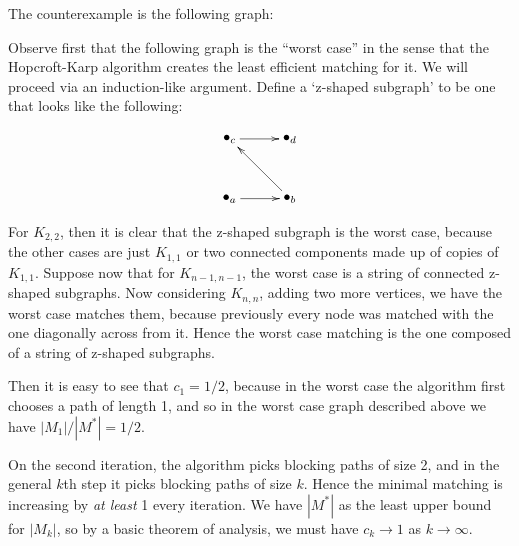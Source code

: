 \documentclass{article}
\newcommand{\problem}[1]{\noindent {\bf #1}}
\begin{document}
\problem{Problem 1.} The counterexample is the following graph:

\problem{Problem 2.} Observe first that the following graph is the ``worst case'' in the sense that the Hopcroft-Karp algorithm creates the least efficient matching for it. We will proceed via an induction-like argument. Define a `z-shaped subgraph' to be one that looks like the following:

\begin{displaymath}
\xygraph{
!{<0cm,0cm>;<1cm,0cm>:<0cm,1cm>::}
!{(0,0) }*+{\bullet_{a}}="a"
!{(1.5,0) }*+{\bullet_{b}}="b"
!{(0,1.5) }*+{\bullet_{c}}="c"
!{(1.5,1.5)}*+{\bullet_{d}}="d"
"a":"b"
"b":"c"
"c":"d"
}
\end{displaymath}

For $K_{2,2}$, then it is clear that the z-shaped subgraph is the worst case, because the other cases are just $K_{1,1}$ or two connected components made up of copies of $K_{1,1}$. Suppose now that for $K_{n-1,n-1}$, the worst case is a string of connected z-shaped subgraphs. Now considering $K_{n,n}$, adding two more vertices, we have the worst case matches them, because previously every node was matched with the one diagonally across from it. Hence the worst case matching is the one composed of a string of z-shaped subgraphs.

Then it is easy to see that $c_1=1/2$, because in the worst case the algorithm first chooses a path of length 1, and so in the worst case graph described above we have $|M_1|/|M^{\ast}|=1/2$.



On the second iteration, the algorithm picks blocking paths of size 2, and in the general $k$th step it picks blocking paths of size $k$. Hence the minimal matching is increasing by \emph{at least} 1 every iteration. We have $|M^{\ast}|$ as the least upper bound for $|M_k|$, so by a basic theorem of analysis, we must have $c_k\to 1$ as $k\to\infty$.
\end{document}
